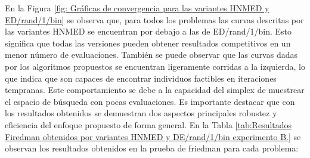 En la Figura \ref{fig: Gráficas de convergencia para las variantes HNMED y ED/rand/1/bin} se observa que, para todos los problemas las curvas descritas por las variantes HNMED se encuentran por debajo a las de ED/rand/1/bin. Esto significa que todas las versiones pueden obtener resultados competitivos en un menor número de evaluaciones. También se puede observar que las curvas dadas por los algoritmos propuestos se encuentran ligeramente corridas a la izquierda, lo que indica que son capaces de encontrar individuos factibles en iteraciones tempranas. Este comportamiento se debe a la capacidad del simplex de muestrear el espacio de búsqueda con pocas evaluaciones. Es importante destacar que con los resultados obtenidos se demuestran dos aspectos principales robustez y eficiencia del enfoque propuesto de forma general. 
En la Tabla \ref{tab:Resultados Firedman obtenidos por variantes HNMED y DE/rand/1/bin  experimento B.} se observan los resultados obtenidos en la prueba de friedman para cada problema:

